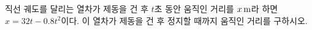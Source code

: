 직선 궤도를 달리는 열차가 제동을 건 후 $t$초 동안 움직인 거리를 $x\mkern3mu \mathrm{m}$라 하면 $x=32t-0.8t^2$이다. 이 열차가 제동을 건 후 정지할 때까지 움직인 거리를 구하시오.
